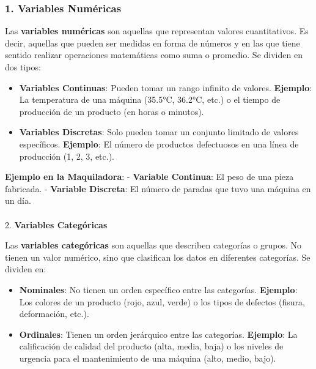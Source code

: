 \documentclass[
  10pt,
  letterpaper,
]{book}
\makeatletter
\let\oldparagraph\paragraph
\renewcommand{\paragraph}{
    \@ifstar
      \xxxParagraphStar
      \xxxParagraphNoStar
  }
\newcommand{\xxxParagraphStar}[1]{\oldparagraph*{#1}\mbox{}}
\newcommand{\xxxParagraphNoStar}[1]{\oldparagraph{#1}\mbox{}}
\makeatother
\begin{document}
\subsubsection{\texorpdfstring{1. \textbf{Variables
Numéricas}}{1. Variables Numéricas}}\label{variables-numuxe9ricas}

Las \textbf{variables numéricas} son aquellas que representan valores
cuantitativos. Es decir, aquellas que pueden ser medidas en forma de
números y en las que tiene sentido realizar operaciones matemáticas como
suma o promedio. Se dividen en dos tipos:

\begin{itemize}
\item
  \textbf{Variables Continuas}: Pueden tomar un rango infinito de
  valores. \textbf{Ejemplo}: La temperatura de una máquina (35.5°C,
  36.2°C, etc.) o el tiempo de producción de un producto (en horas o
  minutos).
\item
  \textbf{Variables Discretas}: Solo pueden tomar un conjunto limitado
  de valores específicos. \textbf{Ejemplo}: El número de productos
  defectuosos en una línea de producción (1, 2, 3, etc.).
\end{itemize}

\textbf{Ejemplo en la Maquiladora}: - \textbf{Variable Continua}: El
peso de una pieza fabricada. - \textbf{Variable Discreta}: El número de
paradas que tuvo una máquina en un día.

\paragraph{\texorpdfstring{2. \textbf{Variables
Categóricas}}{2. Variables Categóricas}}\label{variables-categuxf3ricas}

Las \textbf{variables categóricas} son aquellas que describen categorías
o grupos. No tienen un valor numérico, sino que clasifican los datos en
diferentes categorías. Se dividen en:

\begin{itemize}
\item
  \textbf{Nominales}: No tienen un orden específico entre las
  categorías. \textbf{Ejemplo}: Los colores de un producto (rojo, azul,
  verde) o los tipos de defectos (fisura, deformación, etc.).
\item
  \textbf{Ordinales}: Tienen un orden jerárquico entre las categorías.
  \textbf{Ejemplo}: La calificación de calidad del producto (alta,
  media, baja) o los niveles de urgencia para el mantenimiento de una
  máquina (alto, medio, bajo).
\end{itemize}
\end{document}

